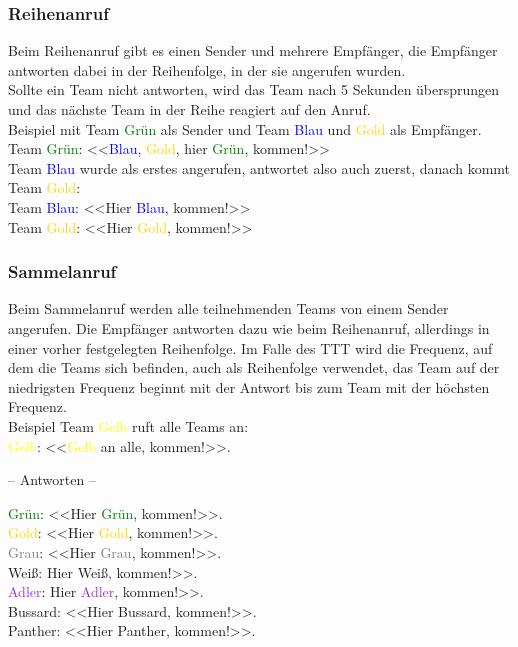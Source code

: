 \subsubsection{Reihenanruf}
	Beim Reihenanruf gibt es einen Sender und mehrere Empfänger, die Empfänger antworten dabei in der Reihenfolge, in der sie angerufen wurden. \\
	Sollte ein Team nicht antworten, wird das Team nach 5 Sekunden übersprungen und das nächste Team in der Reihe reagiert auf den Anruf. \\
	Beispiel mit Team \textcolor{green}{Grün} als Sender und Team \textcolor{blue}{Blau} und \textcolor{gold}{Gold} als Empfänger. \\
	Team \textcolor{green}{Grün}: <<\textcolor{blue}{Blau}, \textcolor{gold}{Gold}, hier \textcolor{green}{Grün}, kommen!>> \\
	Team \textcolor{blue}{Blau} wurde als erstes angerufen, antwortet also auch zuerst, danach kommt Team \textcolor{gold}{Gold}: \\
	Team \textcolor{blue}{Blau}: <<Hier \textcolor{blue}{Blau}, kommen!>> \\
	Team \textcolor{gold}{Gold}: <<Hier \textcolor{gold}{Gold}, kommen!>> \\

\subsubsection{Sammelanruf}
	Beim Sammelanruf werden alle teilnehmenden Teams von einem Sender angerufen. Die Empfänger antworten dazu wie beim Reihenanruf, allerdings in einer vorher festgelegten Reihenfolge. Im Falle des TTT wird die Frequenz, auf dem die Teams sich befinden, auch als Reihenfolge verwendet, das Team auf der niedrigsten Frequenz beginnt mit der Antwort bis zum Team mit der höchsten Frequenz. \\
	Beispiel Team \textcolor{yellow}{Gelb} ruft alle Teams an: \\
	\textcolor{yellow}{Gelb}: <<\textcolor{yellow}{Gelb} an alle, kommen!>>. \\
		\begin{center}
			– Antworten – \\
		\end{center}
	\textcolor{green}{Grün}: <<Hier \textcolor{green}{Grün}, kommen!>>. \\
	\textcolor{gold}{Gold}: <<Hier \textcolor{gold}{Gold}, kommen!>>. \\
	\textcolor{gray}{Grau}: <<Hier \textcolor{gray}{Grau}, kommen!>>. \\
	Weiß: Hier Weiß, kommen!>>. \\
	\textcolor{DarkOrchid}{Adler}: Hier \textcolor{DarkOrchid}{Adler}, kommen!>>. \\
	Bussard: <<Hier Bussard, kommen!>>. \\
	Panther: <<Hier Panther, kommen!>>. \\	


